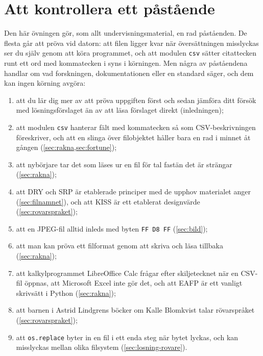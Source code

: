 
\chapter{Att kontrollera ett påstående}
\label{app:verifiera-ovning-filer}

Den här övningen gör, som allt undervisningsmaterial, en rad påståenden.
De flesta går att pröva vid datorn: att filen ligger kvar när
översättningen misslyckas ser du själv genom att köra programmet, och
att modulen \texttt{csv} sätter citattecken runt ett ord med
kommatecken i syns i körningen.  Men några av påståendena handlar om vad
forskningen, dokumentationen eller en standard säger, och dem kan ingen
körning avgöra:
\begin{enumerate}
  \item att du lär dig mer av att pröva uppgiften först och sedan jämföra
    ditt försök med lösningsförslaget än av att läsa förslaget direkt
    (inledningen);
  \item att modulen \texttt{csv} hanterar fält med
    kommatecken så som CSV-beskrivningen föreskriver, och att en slinga
    över filobjektet håller bara en rad i minnet åt gången
    (\cref{sec:rakna,sec:fortune});
  \item att nybörjare tar det som läses ur en fil för tal fastän det är
    strängar (\cref{sec:rakna});
  \item att DRY och SRP är etablerade principer med de upphov materialet
    anger (\cref{sec:filnamnet}), och att KISS är ett etablerat
    designvärde (\cref{sec:rovarspraket});
  \item att en JPEG-fil alltid inleds med byten \texttt{FF D8 FF}
    (\cref{sec:bild});
  \item att man kan pröva ett filformat genom att skriva och läsa
    tillbaka (\cref{sec:rakna});
  \item att kalkylprogrammet LibreOffice Calc frågar efter
    skiljetecknet när en CSV-fil öppnas, att Microsoft Excel inte gör
    det, och att EAFP är ett vanligt skrivsätt i Python
    (\cref{sec:rakna});
  \item att barnen i Astrid Lindgrens böcker om Kalle Blomkvist talar
    rövarspråket (\cref{sec:rovarspraket});
  \item att \texttt{os.replace} byter in en fil i ett enda
    steg när bytet lyckas, och kan misslyckas mellan olika filsystem
    (\cref{sec:losning-rovare}).
\end{enumerate}
